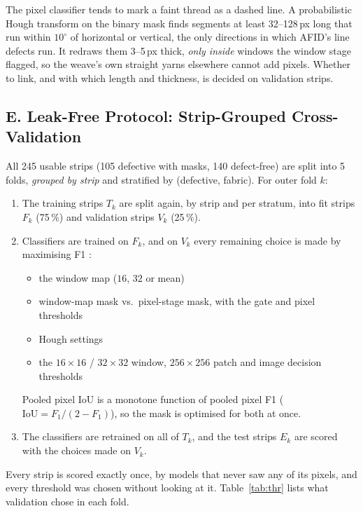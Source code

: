 \documentclass[11pt,a4paper]{article}
\begin{document}
The pixel classifier tends to mark a faint thread as a dashed line. A probabilistic Hough transform \cite{duda1972,matas2000} on the binary mask finds segments at least 32--128\,px long that run within $10^\circ$ of horizontal or vertical, the only directions in which AFID's line defects run. It redraws them 3--5\,px thick, \emph{only inside} windows the window stage flagged, so the weave's own straight yarns elsewhere cannot add pixels. Whether to link, and with which length and thickness, is decided on validation strips.

\subsection*{E. Leak-Free Protocol: Strip-Grouped Cross-Validation}

All 245 usable strips (105 defective with masks, 140 defect-free) are split into 5 folds, \emph{grouped by strip} and stratified by (defective, fabric). For outer fold $k$:
\begin{enumerate}
  \item The training strips $T_k$ are split again, by strip and per stratum, into fit strips $F_k$ (75\,\%) and validation strips $V_k$ (25\,\%).
  \item Classifiers are trained on $F_k$, and on $V_k$ every remaining choice is made by maximising F1 \cite{varma2006}:
  \begin{itemize}
    \item the window map ($16$, $32$ or mean)
    \item window-map mask vs.\ pixel-stage mask, with the gate and pixel thresholds
    \item Hough settings
    \item the $16\times16$ / $32\times32$ window, $256\times256$ patch and image decision thresholds
  \end{itemize}
  Pooled pixel IoU is a monotone function of pooled pixel F1 ($\mathrm{IoU}=F_1/(2-F_1)$), so the mask is optimised for both at once.
  \item The classifiers are retrained on all of $T_k$, and the test strips $E_k$ are scored with the choices made on $V_k$.
\end{enumerate}
Every strip is scored exactly once, by models that never saw any of its pixels, and every threshold was chosen without looking at it. Table~\ref{tab:thr} lists what validation chose in each fold.

\end{document}
